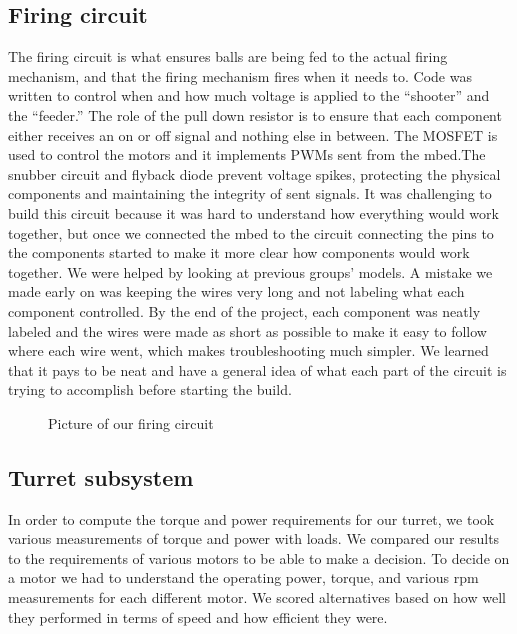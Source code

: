 \documentclass{article}
\begin{document}
\subsection{Firing circuit}
The firing circuit is what ensures balls are being fed to the actual firing mechanism, and that the firing mechanism fires when it needs to. Code was written to control when and how much voltage is applied to the “shooter” and the “feeder.” The role of the pull down resistor is to ensure that each component either receives an on or off signal and nothing else in between. The MOSFET is used to control the motors and it implements PWMs sent from the mbed.The snubber circuit and flyback diode prevent voltage spikes, protecting the physical components and maintaining the integrity of sent signals. It was challenging to build this circuit because it was hard to understand how everything would work together, but once we connected the mbed to the circuit connecting the pins to the components started to make it more clear how components would work together. We were helped by looking at previous groups’ models. A mistake we made early on was keeping the wires very long and not labeling what each component controlled. By the end of the project, each component was neatly labeled and the wires were made as short as possible to make it easy to follow where each wire went, which makes troubleshooting much simpler. We learned that it pays to be neat and have a general idea of what each part of the circuit is trying to accomplish before starting the build.

\begin{figure}
\caption{Picture of our firing circuit}
\end{figure}






\subsection{Turret subsystem}		
In order to compute the torque and power requirements for our turret, we took various measurements of torque and power with loads. We compared our results to the requirements of various motors to be able to make a decision. To decide on a motor we had to understand the operating power, torque, and various rpm measurements for each different motor. We scored alternatives based on how well they performed in terms of speed and how efficient they were.
\end{document}

